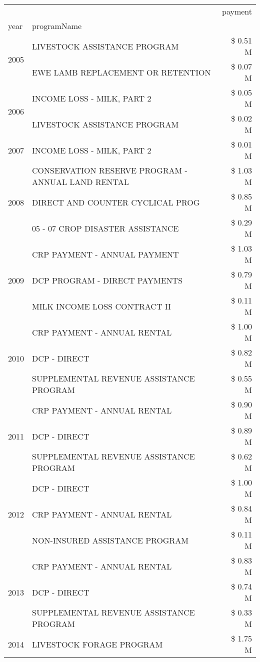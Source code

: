\begin{tabular}{llr}
\toprule
 &  & payment \\
year & programName &  \\
\midrule
\multirow[t]{2}{*}{2005} & LIVESTOCK ASSISTANCE PROGRAM & \$ 0.51 M \\
 & EWE LAMB REPLACEMENT OR RETENTION & \$ 0.07 M \\
\cline{1-3}
\multirow[t]{2}{*}{2006} & INCOME LOSS - MILK, PART 2 & \$ 0.05 M \\
 & LIVESTOCK ASSISTANCE PROGRAM & \$ 0.02 M \\
\cline{1-3}
2007 & INCOME LOSS - MILK, PART 2 & \$ 0.01 M \\
\cline{1-3}
\multirow[t]{3}{*}{2008} & CONSERVATION RESERVE PROGRAM - ANNUAL LAND RENTAL & \$ 1.03 M \\
 & DIRECT AND COUNTER CYCLICAL PROG & \$ 0.85 M \\
 & 05 - 07 CROP DISASTER ASSISTANCE & \$ 0.29 M \\
\cline{1-3}
\multirow[t]{3}{*}{2009} & CRP PAYMENT - ANNUAL PAYMENT & \$ 1.03 M \\
 & DCP PROGRAM - DIRECT PAYMENTS & \$ 0.79 M \\
 & MILK INCOME LOSS CONTRACT II & \$ 0.11 M \\
\cline{1-3}
\multirow[t]{3}{*}{2010} & CRP PAYMENT - ANNUAL RENTAL & \$ 1.00 M \\
 & DCP - DIRECT & \$ 0.82 M \\
 & SUPPLEMENTAL REVENUE ASSISTANCE PROGRAM & \$ 0.55 M \\
\cline{1-3}
\multirow[t]{3}{*}{2011} & CRP PAYMENT - ANNUAL RENTAL & \$ 0.90 M \\
 & DCP - DIRECT & \$ 0.89 M \\
 & SUPPLEMENTAL REVENUE ASSISTANCE PROGRAM & \$ 0.62 M \\
\cline{1-3}
\multirow[t]{3}{*}{2012} & DCP - DIRECT & \$ 1.00 M \\
 & CRP PAYMENT - ANNUAL RENTAL & \$ 0.84 M \\
 & NON-INSURED ASSISTANCE PROGRAM & \$ 0.11 M \\
\cline{1-3}
\multirow[t]{3}{*}{2013} & CRP PAYMENT - ANNUAL RENTAL & \$ 0.83 M \\
 & DCP - DIRECT & \$ 0.74 M \\
 & SUPPLEMENTAL REVENUE ASSISTANCE PROGRAM & \$ 0.33 M \\
\cline{1-3}
\multirow[t]{3}{*}{2014} & LIVESTOCK FORAGE PROGRAM & \$ 1.75 M \\

\end{tabular}
